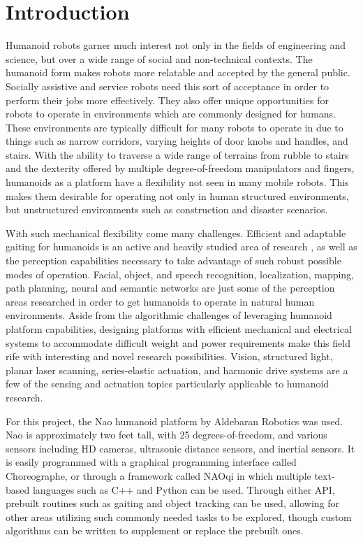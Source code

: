\chapter{Introduction}

Humanoid robots garner much interest not only in the fields of engineering and science, but over a wide range of social and non-technical contexts. \cite{social1}\cite{comedy1}
The humanoid form makes robots more relatable and accepted by the general public. Socially assistive and service robots need this sort of acceptance in order to perform their jobs more effectively. \cite{social2}
They also offer unique opportunities for robots to operate in environments which are commonly designed for humans. These environments are typically difficult for many robots to operate in due to things such as narrow corridors, varying heights of door knobs and handles, and stairs.
With the ability to traverse a wide range of terrains from rubble to stairs and the dexterity offered by multiple degree-of-freedom manipulators and fingers, humanoids as a platform have a flexibility not seen in many mobile robots. This makes them desirable for operating not only in human structured environments, but unstructured environments such as construction and disaster scenarios. 
\cite{darpa1}

With such mechanical flexibility come many challenges. Efficient and adaptable gaiting for humanoids is an active and heavily studied area of research \cite{zmp_human1}\cite{naogait1}, as well as the perception capabilities necessary to take advantage of such robust possible modes of operation. Facial, object, and speech recognition, localization, mapping, path planning, neural and semantic networks are just some of the perception areas researched in order to get humanoids to operate in natural human environments.
\cite{icub_recog1}\cite{vslam1}\cite{path1}\cite{icub_net1}
Aside from the algorithmic challenges of leveraging humanoid platform capabilities, designing platforms with efficient mechanical and electrical systems to accommodate difficult weight and power requirements make this field rife with interesting and novel research possibilities. Vision, structured light, planar laser scanning, series-elastic actuation, and harmonic drive systems are a few of the sensing and actuation topics particularly applicable to humanoid research.

For this project, the Nao humanoid platform by Aldebaran Robotics was used. Nao is approximately two feet tall, with 25 degrees-of-freedom, and various sensors including HD cameras, ultrasonic distance sensors, and inertial sensors. It is easily programmed with a graphical programming interface called Choreographe, or through a framework called NAOqi in which multiple text-based languages such as C++ and Python can be used. Through either API, prebuilt routines such as gaiting and object tracking can be used, allowing for other areas utilizing such commonly needed tasks to be explored, though custom algorithms can be written to supplement or replace the prebuilt ones.

